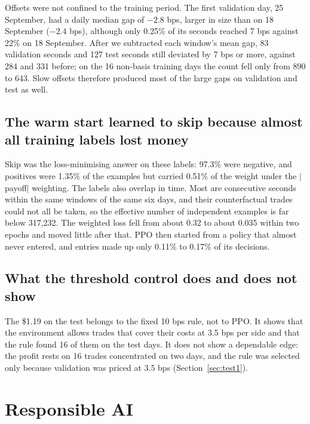 \documentclass[12pt,a4paper]{article}
\DeclareRobustCommand{\bps}{\ifmmode\,\text{bps}\else\,bps\fi}
\begin{document}
Offsets were not confined to the training period. The first validation day, 25 September,
had a daily median gap of $-2.8$\bps, larger in size than on 18 September ($-2.4$\bps),
although only 0.25\% of its seconds reached 7\bps{} against 22\% on 18 September. After we
subtracted each window's mean gap, 83 validation seconds and 127 test seconds still deviated
by 7\bps{} or more, against 284 and 331 before; on the 16 non-basis training days the count
fell only from 890 to 643. Slow offsets therefore produced most of the large gaps on
validation and test as well.

\subsection{The warm start learned to skip because almost all training labels lost money}
Skip was the loss-minimising answer on these labels: 97.3\% were negative, and positives
were 1.35\% of the examples but carried 0.51\% of the weight under the $|$payoff$|$
weighting. The labels also overlap in time. Most are consecutive seconds within the same
windows of the same six days, and their counterfactual trades could not all be taken, so the
effective number of independent examples is far below 317,232. The weighted loss fell from
about 0.32 to about 0.035 within two epochs and moved little after that. PPO then started from
a policy that almost never entered, and entries made up only 0.11\% to 0.17\% of its
decisions.

\subsection{What the threshold control does and does not show}\label{sec:control}
The \$1.19 on the test belongs to the fixed 10\bps{} rule, not to PPO. It shows that the
environment allows trades that cover their costs at 3.5\bps{} per side and that the rule
found 16 of them on the test days. It does not show a dependable edge: the profit rests on
16 trades concentrated on two days, and the rule was selected only because validation was
priced at 3.5\bps{} (Section~\ref{sec:test1}).

\section{Responsible AI}\label{sec:rai}
\end{document}
